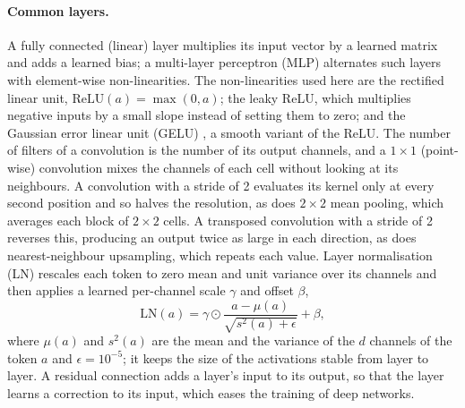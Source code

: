 \documentclass[english, 12pt, a4paper, elec, utf8, a-2b, online]{aaltothesis}
\begin{document}
\paragraph{Common layers.}
A fully connected (linear) layer multiplies its input vector by a learned
matrix and adds a learned bias; a multi-layer perceptron (MLP) alternates such layers
with element-wise non-linearities. The non-linearities used here are the
rectified linear unit, $\mathrm{ReLU}(a) = \max(0, a)$; the leaky ReLU, which
multiplies negative inputs by a small slope instead of setting them to zero;
and the Gaussian error linear unit (GELU) \cite{hendrycks2016gelu}, a smooth
variant of the ReLU. The
number of filters of a convolution is the number of its output channels, and a
$1 \times 1$ (point-wise) convolution mixes the channels of each cell without
looking at its neighbours. A convolution with a stride of 2 evaluates its
kernel only at every second position and so halves the resolution, as does
$2 \times 2$ mean pooling, which averages each block of $2 \times 2$ cells. A
transposed convolution with a stride of 2 reverses this, producing an output
twice as large in each direction, as does nearest-neighbour upsampling, which
repeats each value. Layer normalisation (LN) \cite{ba2016layernorm} rescales each
token to zero mean and unit variance over its channels and then applies a
learned per-channel scale $\gamma$ and offset $\beta$,
\begin{equation}
	\mathrm{LN}(a) = \gamma \odot \frac{a - \mu(a)}{\sqrt{s^2(a) + \epsilon}} + \beta,
	\label{eq:bg_ln}
\end{equation}
where $\mu(a)$ and $s^2(a)$ are the mean and the variance of the $d$ channels of
the token $a$ and $\epsilon = 10^{-5}$; it keeps the size of the activations
stable from layer to layer. A residual connection \cite{he2016resnet} adds a
layer's input to its output, so that the layer learns a correction to its
input, which eases the training of deep networks.
\end{document}
